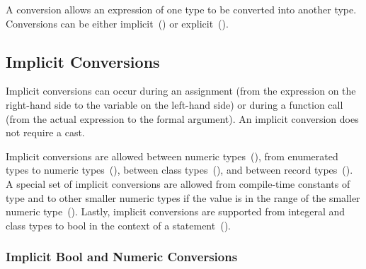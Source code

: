 \label{Conversions}

A conversion allows an expression of one type to be converted into
another type.  Conversions can be either
implicit~() or
explicit~().

\subsection{Implicit Conversions}
\label{Implicit_Conversions}

Implicit conversions can occur during an assignment (from the
expression on the right-hand side to the variable on the left-hand
side) or during a function call (from the actual expression to the
formal argument).  An implicit conversion does not require a cast.

Implicit conversions are allowed between numeric
types~(), from enumerated types to
numeric types~(), between class
types~(), and between record
types~().  A special set of implicit
conversions are allowed from compile-time constants of type 
and  to other smaller numeric types if the value is in
the range of the smaller numeric
type~().  Lastly,
implicit conversions are supported from integeral and class types to
bool in the context of a
statement~().

\subsubsection{Implicit Bool and Numeric Conversions}
\label{Implicit_Numeric_Conversions}

